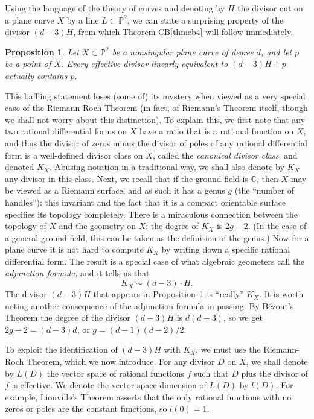 \documentclass{bull-l}
\newtheorem{prop}{Proposition}
\theoremstyle{pplain}
\theoremstyle{definition}
\begin{document}
Using the language of the theory of curves and denoting by $H$ the divisor cut
on a plane curve $X$ by a line $L\subset \mathbb{P}^2$, we can state a
surprising property of the divisor $(d-3)H$, from which Theorem CB\ref{thmcb4}
will follow immediately.

\begin{prop}\label{prop:four}
Let $X\subset \mathbb{P}^2$ be a nonsingular plane curve of degree $d$, and let
$p$ be a point of $X$.  Every effective divisor linearly equivalent to
$(d-3)H+p$ actually contains $p$.
\end{prop}

This baffling statement loses (some of) its mystery when viewed as a very
special case of the Riemann-Roch Theorem (in fact, of Riemann's Theorem itself,
though we shall not worry about this distinction).  To explain this, we first
note that any two rational differential forms on $X$ have a ratio that is a
rational function on $X$, and thus the divisor of zeros minus the divisor of
poles of any rational differential form is a well-defined divisor class on $X$,
called the \emph{canonical divisor class}, and denoted $K_X$.   Abusing
notation in a traditional way, we shall also denote by $K_X$ any divisor in
this class.  Next, we recall that if the ground field is $\mathbb{C}$, then $X$
may be viewed as a Riemann surface, and as such it has a genus $g$ (the
``number  of handles''); this invariant and the fact that it is a compact
orientable surface specifies its topology completely.  There is a miraculous
connection between the topology of $X$ and the geometry on $X$: the degree of
$K_X$ is $2g-2$.  (In the case of a general ground field, this can be taken as
the definition of the genus.) Now for a plane curve it is not hard to compute
$K_X$ by writing down a specific rational differential form.  The result is a
special case of what algebraic geometers call the \emph{adjunction formula},
and it tells us that
\[K_X\sim (d-3)\cdot H.\]
The divisor $(d-3)H$ that appears in Proposition~\ref{prop:four} is ``really''
$K_X$.  It is worth noting another consequence of the adjunction formula in
passing.  By B\'ezout's Theorem the degree of the divisor $(d-3)H$ is $d(d-3)$,
so we get $2g-2=(d-3)d$, or $g=(d-1)(d-2)/2$.

To exploit the identification of $(d-3)H$ with $K_X$, we must use the 
Riemann-Roch Theorem, which we now introduce.  For any divisor $D$ on $X$, we
shall denote by $L(D)$ the vector space of rational functions $f$ such that $D$
plus the divisor of $f$ is effective.  We denote the vector space dimension of
$L(D)$ by $l(D)$.  For example, Liouville's Theorem asserts that the only
rational functions with no zeros or poles are the constant functions, so 
$l(0)=1$.
\end{document}
